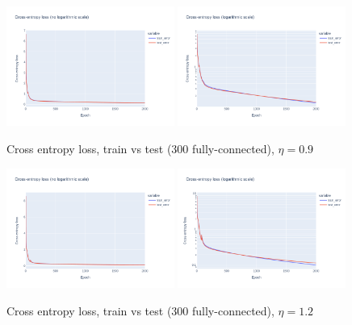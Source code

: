 \documentclass[12pt]{article}
\begin{document}
\begin{figure}[ht]
  \centering
  \includegraphics[width=0.49\textwidth]{images/cross-entropy-comparison-1-300-lr0.9.png}
  \includegraphics[width=0.49\textwidth]{images/cross-entropy-comparison-1-300-lr0.9-log.png}
  \caption{Cross entropy loss, train vs test ($300$ fully-connected), $\eta = 0.9$}
  \label{fig: learning rate comparison 0.9}
\end{figure}
\begin{figure}[ht]
  \centering
  \includegraphics[width=0.49\textwidth]{images/cross-entropy-comparison-1-300-lr1.2.png}
  \includegraphics[width=0.49\textwidth]{images/cross-entropy-comparison-1-300-lr1.2-log.png}
  \caption{Cross entropy loss, train vs test ($300$ fully-connected), $\eta = 1.2$}
  \label{fig: learning rate comparison 1.2}
\end{figure}
\end{document}
